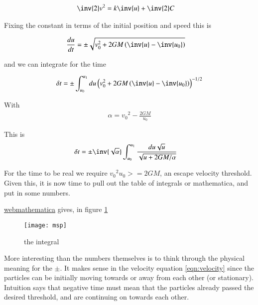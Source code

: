 \documentclass{article}
\begin{document}
\begin{align*}
\inv{2}v^2 &= k \inv{u} + \inv{2}C
\end{align*}

Fixing the constant in terms of the initial position and speed this is

\begin{align}\label{eqn:velocity}
\frac{du}{dt} &= \pm \sqrt{v_0^2 + 2 G M \left(\inv{u} - \inv{u_0}\right)}
\end{align}

and we can integrate for the time

\begin{align*}
\delta t 
&= \pm \int_{u_0}^{u_1} du \left(v_0^2 + 2 G M \left(\inv{u} - \inv{u_0}\right)\right)^{-1/2} \\
\end{align*}

With
\begin{align*}
\alpha = {v_0}^2 - \frac{2GM}{u_0}
\end{align*}

This is
\begin{align*}
\delta t 
&= \pm \inv{\sqrt{\alpha}} \int_{u_0}^{u_1} \frac{du \sqrt{u}}{\sqrt{u + 2 G M/\alpha}}
\end{align*}

For the time to be real we require ${v_0}^2 u_0 >= 2 GM$, an escape velocity threshold.  Given this, it is now
time to pull out the table of integrals or mathematica, and put in some numbers.

\href{http://calc101.com/webMathematica/integrals.jsp}{webmathematica} gives, in figure \ref{fig:msp}

\begin{figure}[htp]
\centering
\texttt{[image: msp]}
\caption{the integral}\label{fig:msp}
\end{figure}

More interesting than the numbers themselves is to think through the physical meaning for the $\pm$.  It makes sense in the velocity equation \ref{eqn:velocity} since the particles can be initially moving towards or away from each other (or stationary).  Intuition says that negative time must mean that the particles already passed the desired threshold, and are continuing on towards each other.

%
%
\end{document}
